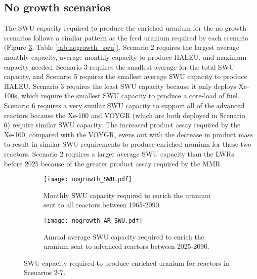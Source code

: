 \subsection{No growth scenarios} \label{sec:nogrowth_swu}
The \gls{SWU} capacity required to produce the enriched uranium for 
the no growth scenarios follows a similar pattern as 
the feed uranium required by each scenario (Figure \ref{fig:nogrowth_swu}, 
Table \ref{tab:nogrowth_swu}). Scenario 2 requires the largest average 
monthly capacity, average monthly capacity to produce \gls{HALEU}, and maximum 
capacity needed. Scenario 3 requires the smallest average for the total 
\gls{SWU} capacity, 
and Scenario 5 requires the smallest average 
\gls{SWU} capacity to produce \gls{HALEU}. Scenario 3 requires the least 
\gls{SWU} capacity because it only deploys Xe-100s, which require the 
smallest \gls{SWU} capacity to produce a core-load of fuel. Scenario 
6 requires a very similar \gls{SWU} capacity to support all of the 
advanced reactors because the Xe-100 and VOYGR (which are both deployed 
in Scenario 6) require similar \gls{SWU} capacity. The increased 
product assay required by the Xe-100, compared with the VOYGR, evens 
out with the decrease in product mass to result in similar \gls{SWU} 
requirements to produce enriched uranium for these two reactors. 
Scenario 2 requires a larger average \gls{SWU} capacity 
than the \glspl{LWR} before 2025 because of the greater product 
assay required by the \gls{MMR}. 

\begin{figure}[h!]
    \centering
    \begin{subfigure}[b]{0.45\textwidth}
        \centering
        \texttt{[image: nogrowth\_SWU.pdf]}
        \caption{Monthly \gls{SWU} capacity required to enrich the  
        uranium sent to all reactors between 1965-2090.}
        \label{fig:nogrowth_all_SWU}
    \end{subfigure}
    \hfill
    \begin{subfigure}[b]{0.45\textwidth}
        \centering
        \texttt{[image: nogrowth\_AR\_SWU.pdf]}
        \caption{Annual average \gls{SWU} capacity required to enrich 
        the uranium sent to advanced reactors between 2025-2090.}
        \label{fig:nogrowth_AR_SWU}
    \end{subfigure}
       \caption{\gls{SWU} capacity required to produce enriched uranium 
       for reactors in Scenarios 2-7.}
       \label{fig:nogrowth_swu}
\end{figure}

